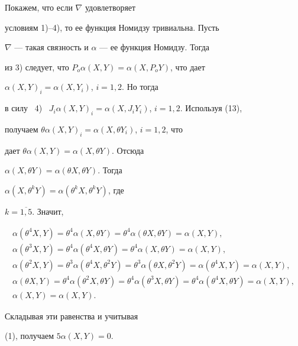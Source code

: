 \begin{pf}


Покажем, что если $\nabla$ удовлетворяет


условиям 1)--4), то ее функция Номидзу тривиальна. Пусть


$\nabla$ --- такая связность и $\alpha$ --- ее функция Номидзу. Тогда


из 3) следует, что $P_o\alpha(X,Y)=\alpha(X,P_oY)$, что дает


$\alpha(X,Y)_i=\alpha(X,Y_i)$, $i=1,2$. Но тогда


в силу ~4) \ $J_i\alpha(X,Y)_i=\alpha(X,J_iY_i)$, $i=1,2$. Используя (13),


получаем $\theta \alpha(X,Y)_i=\alpha(X,\theta Y_i)$, $i=1,2$, что


дает $\theta \alpha(X,Y)=\alpha(X,\theta Y)$. Отсюда


$\alpha(X,\theta Y)=\alpha(\theta X, \theta Y)$. Тогда


$\alpha(X,\theta^kY)=\alpha(\theta^kX,\theta^kY)$, где


$k=\overline{1,5}$. Значит,


\begin{gather*}


\alpha(\theta^4X,Y)=\theta^4\alpha(X,\theta


Y)=\theta^4\alpha(\theta X,\theta Y)=\alpha(X,Y),\\


\alpha(\theta^3X,Y)=\theta^4\alpha(\theta^4X,\theta


Y)=\theta^4\alpha( X,\theta Y)=\alpha(X,Y),\\


\alpha(\theta^2X,Y)=\theta^3\alpha(\theta^4X,\theta^2Y)=


\theta^3\alpha(\theta X,\theta^2Y)=\alpha(\theta^4X,Y)=\alpha(X,Y), \\


\alpha(\theta X,Y)=\theta^4\alpha(\theta^2X,\theta Y)=


\theta^4\alpha(\theta^3


X,\theta Y)=\theta^4\alpha(\theta^4X,\theta Y)=\alpha(X,Y),\\


\alpha(X,Y)=\alpha(X,Y).


\end{gather*}


Складывая эти равенства и учитывая


(1), получаем $5\alpha(X,Y)=0$.


\end{pf}





